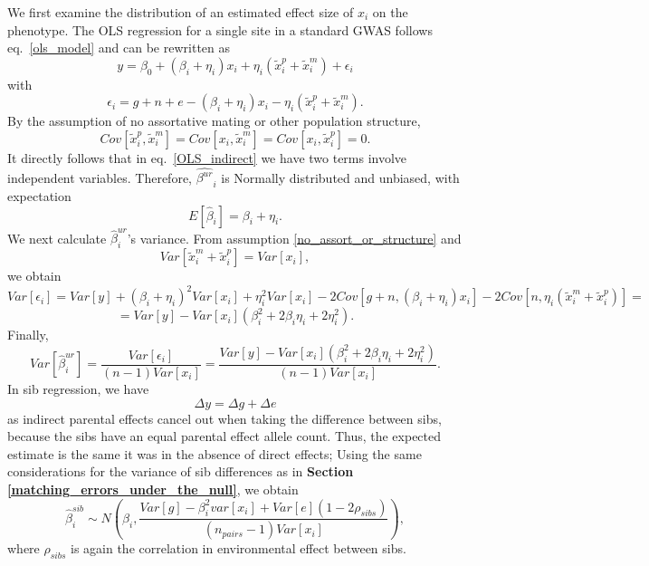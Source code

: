 \documentclass[hidelinks, 12pt]{article}
\begin{document}
We first examine the distribution of an estimated effect size of $x_i$ on the phenotype.  The OLS regression for a single site in a standard GWAS follows eq.~\ref{ols_model} and can be rewritten as
\begin{equation}
\label{OLS_indirect}
y=\beta_0+(\beta_i+\eta_i)x_i+\eta_i(\tilde{x}_i^p+\tilde{x}_i^m)+\epsilon_i
\end{equation}
with
$$\epsilon_i=g+n+e-(\beta_i+\eta_i)x_i-\eta_i(\tilde{x}_i^p+\tilde{x}_i^m).$$
By the assumption of no assortative mating or other population structure,
\begin{equation}
\label{no_assort_or_structure}
Cov[\tilde{x}_i^p,\tilde{x}_i^m]=Cov[x_i,\tilde{x}_i^m]=Cov[x_i,\tilde{x}_i^p]=0.
\end{equation}
It directly follows that in eq.~\ref{OLS_indirect} we have two terms involve independent variables.  Therefore,  $\hat{\beta^{ur}}_i$ is Normally distributed and unbiased, with expectation 
$$E[\hat{\beta}_i]=\beta_i+\eta_i.$$
We next calculate $\hat{\beta}_i^{ur}$'s variance. From assumption \ref{no_assort_or_structure} and 
$$Var[\tilde{x}_i^m+\tilde{x}_i^p]=Var[x_i],$$
we obtain
$$Var[\epsilon_i]=Var[y]+(\beta_i+\eta_i)^2Var[x_i]+\eta_i^2Var[x_i]-2Cov[g+n,(\beta_i+\eta_i)x_i]-2Cov[n,\eta_i(\tilde{x}_i^m+\tilde{x}_i^p)]=$$
$$=Var[y]-Var[x_i] (\beta_i^2+2\beta_i \eta_i + 2 \eta_i^2).$$
Finally,
$$Var[\hat{\beta}_i^{ur}]=\frac{Var[\epsilon_i]}{(n-1)Var[x_i]}=\frac{Var[y]-Var[x_i] (\beta_i^2+2\beta_i \eta_i + 2 \eta_i^2)}{(n-1)Var[x_i]}.$$
In sib regression, we have
$$\Delta y=\Delta g+\Delta e$$
as indirect parental effects cancel out when taking the difference between sibs, because the sibs have an equal parental effect allele count. Thus, the expected estimate is the same it was in the absence of direct effects;  Using the same considerations for the variance of sib differences as in {\bf Section \ref{matching_errors_under_the_null}}, we obtain    
$$\hat{\beta}_i^{sib} \sim N(\beta_i,\frac{Var[g] - \beta_i^2var[x_i] + Var[e](1-2\rho_{sibs})}{(n_{pairs}-1) Var[x_i]}),$$
where $\rho_{sibs}$ is again the correlation in environmental effect between sibs.
\end{document}
